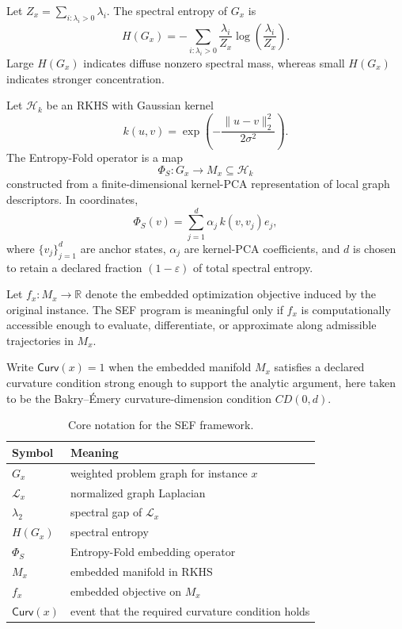\documentclass{svjour3}
\begin{document}
\begin{definition}
Let $Z_x=\sum_{i:\lambda_i>0}\lambda_i$. The spectral entropy of $G_x$ is
\[
H(G_x)= -\sum_{i:\lambda_i>0}\frac{\lambda_i}{Z_x}\log\!\left(\frac{\lambda_i}{Z_x}\right).
\]
Large $H(G_x)$ indicates diffuse nonzero spectral mass, whereas small $H(G_x)$ indicates stronger concentration.
\end{definition}

\begin{definition}
Let $\mathcal{H}_k$ be an RKHS with Gaussian kernel
\[
k(u,v)=\exp\!\left(-\frac{\|u-v\|_2^2}{2\sigma^2}\right).
\]
The Entropy-Fold operator is a map
\[
\Phi_S:G_x\longrightarrow M_x\subseteq \mathcal{H}_k
\]
constructed from a finite-dimensional kernel-PCA representation of local graph descriptors. In coordinates,
\[
\Phi_S(v)=\sum_{j=1}^{d}\alpha_j\,k(v,v_j)e_j,
\]
where $\{v_j\}_{j=1}^d$ are anchor states, $\alpha_j$ are kernel-PCA coefficients, and $d$ is chosen to retain a declared fraction $(1-\varepsilon)$ of total spectral entropy.
\end{definition}

\begin{definition}
Let $f_x: M_x \to \mathbb{R}$ denote the embedded optimization objective induced by the original instance. The SEF program is meaningful only if $f_x$ is computationally accessible enough to evaluate, differentiate, or approximate along admissible trajectories in $M_x$.
\end{definition}

\begin{definition}
Write $\mathsf{Curv}(x)=1$ when the embedded manifold $M_x$ satisfies a declared curvature condition strong enough to support the analytic argument, here taken to be the Bakry--\'Emery curvature-dimension condition $CD(0,d)$.
\end{definition}

\begin{table}[t]
\centering
\caption{Core notation for the SEF framework.}
\label{tab:sef-notation}
\begin{tabular}{ll}
\toprule
Symbol & Meaning \\
\midrule
$G_x$ & weighted problem graph for instance $x$ \\
$\mathcal{L}_x$ & normalized graph Laplacian \\
$\lambda_2$ & spectral gap of $\mathcal{L}_x$ \\
$H(G_x)$ & spectral entropy \\
$\Phi_S$ & Entropy-Fold embedding operator \\
$M_x$ & embedded manifold in RKHS \\
$f_x$ & embedded objective on $M_x$ \\
$\mathsf{Curv}(x)$ & event that the required curvature condition holds \\
\bottomrule
\end{tabular}
\end{table}
\end{document}
